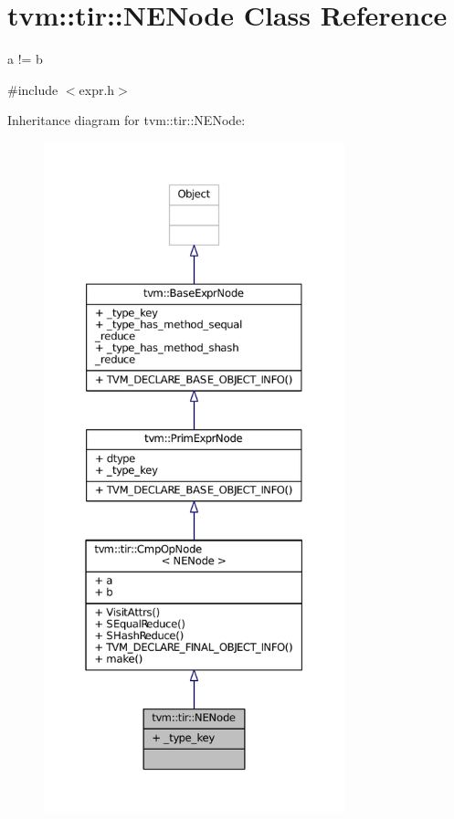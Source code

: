 \hypertarget{classtvm_1_1tir_1_1NENode}{}\section{tvm\+:\+:tir\+:\+:N\+E\+Node Class Reference}
\label{classtvm_1_1tir_1_1NENode}


a != b  




{\ttfamily \#include $<$expr.\+h$>$}



Inheritance diagram for tvm\+:\+:tir\+:\+:N\+E\+Node\+:
\nopagebreak
\begin{figure}[H]
\begin{center}
\leavevmode
\includegraphics[height=550pt]{classtvm_1_1tir_1_1NENode__inherit__graph}
\end{center}
\end{figure}


